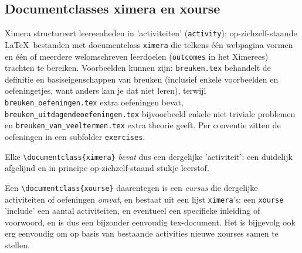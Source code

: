 \documentclass{ximera}
\begin{document}
\label{act:ximeraArchitectuur}
    \author{Wim Obbels}


\subsection{Documentclasses ximera en xourse}


Ximera structureert leereenheden in 'activiteiten' (\verb|activity|): op-zichzelf-staande \LaTeX~bestanden met documentclass \verb|ximera| die telkens één webpagina vormen en één of meerdere welomschreven leerdoelen (\verb|outcomes| in het Ximerees) trachten te bereiken. 
Voorbeelden kunnen zijn: \verb|breuken.tex| behandelt de definitie en basiseigenschappen van breuken (inclusief enkele voorbeelden en oefeningetjes, want anders kan je dat niet leren), terwijl \verb|breuken_oefeningen.tex| extra oefeningen bevat, \verb|breuken_uitdagendeoefeningen.tex| bijvoorbeeld enkele niet triviale problemen en \verb|breuken_van_veeltermen.tex| extra theorie geeft.
Per conventie zitten de oefeningen in een subfolder \verb|exercises|.

Elke \verb|\documentclass{ximera}| \textit{bevat} dus een dergelijke 'activiteit': een duidelijk afgelijnd en in principe op-zichzelf-staand stukje leerstof. 

Een \verb|\documentclass{xourse}| daarentegen is een \textit{cursus} die dergelijke activiteiten of oefeningen \textit{omvat}, en bestaat uit een lijst \verb|ximera|'s: een \verb|xourse| 'include' een aantal activiteiten, en eventueel een specifieke inleiding of voorwoord, en is dus een bijzonder eenvoudig tex-document. Het is bijgevolg ook erg eenvoudig om op basis van bestaande activities nieuwe xourses samen te stellen.
\end{document}
